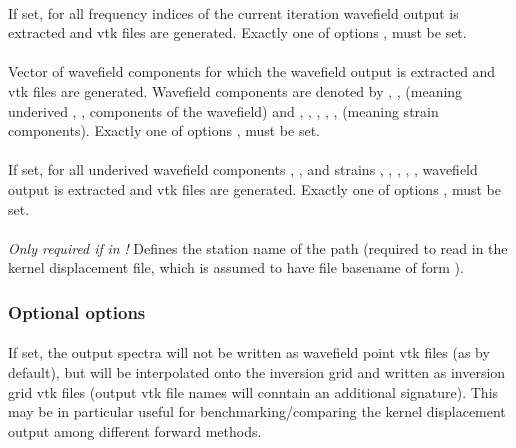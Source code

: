 \paragraph{}
If set, for all frequency indices of the current iteration wavefield output is extracted and 
vtk files are generated. Exactly one of options  ,  must be set.
\paragraph{}
Vector of  wavefield components for which the wavefield output is extracted and 
vtk files are generated. 
Wavefield components are denoted by , ,  (meaning underived , , 
 components of the wavefield) and , , , , ,  
(meaning strain components). 
Exactly one of options ,  must be set.
\paragraph{}
If set, for all underived wavefield components , ,  and
strains , , , , ,  wavefield output is extracted and 
vtk files are generated. 
Exactly one of options ,  must be set.
\paragraph{}
\emph{Only required if}  \emph{in}  \emph{!}
Defines the station name of the path (required to read in the kernel displacement file, which is assumed
to have file basename of form ).

\subsubsection{Optional options}
\paragraph{}
If set, the output spectra will not be written as wavefield point vtk files (as by default), but will be 
interpolated onto the inversion grid and written as inversion grid vtk files (output vtk file names will 
conntain an additional  signature). This may be in particular
useful for benchmarking/comparing the kernel displacement output among different forward methods.
